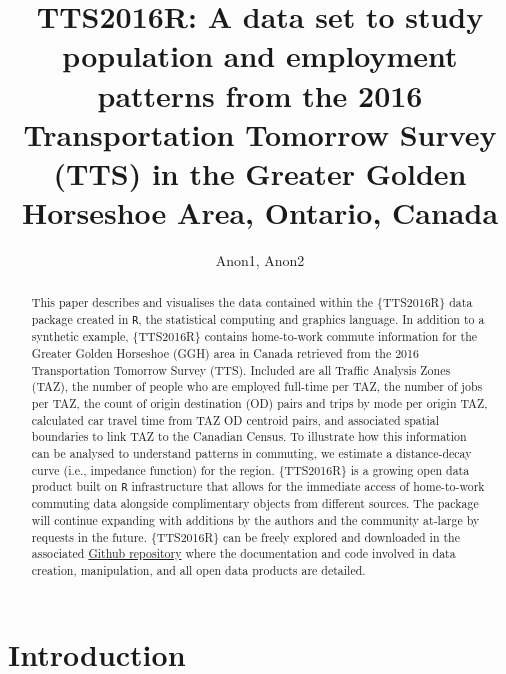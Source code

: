 \documentclass[Royal,times,sageh]{sagej}
\begin{document}

\title{TTS2016R: A data set to study population and employment patterns
from the 2016 Transportation Tomorrow Survey (TTS) in the Greater Golden
Horseshoe Area, Ontario, Canada}

\runninghead{}

\author{Anon1\affilnum{}, Anon2\affilnum{}}

\affiliation{\affilnum{}{}}



\begin{abstract}
This paper describes and visualises the data contained within the
\{TTS2016R\} data package created in \texttt{R}, the statistical
computing and graphics language. In addition to a synthetic example,
\{TTS2016R\} contains home-to-work commute information for the Greater
Golden Horseshoe (GGH) area in Canada retrieved from the 2016
Transportation Tomorrow Survey (TTS). Included are all Traffic Analysis
Zones (TAZ), the number of people who are employed full-time per TAZ,
the number of jobs per TAZ, the count of origin destination (OD) pairs
and trips by mode per origin TAZ, calculated car travel time from TAZ OD
centroid pairs, and associated spatial boundaries to link TAZ to the
Canadian Census. To illustrate how this information can be analysed to
understand patterns in commuting, we estimate a distance-decay curve
(i.e., impedance function) for the region. \{TTS2016R\} is a growing
open data product built on \texttt{R} infrastructure that allows for the
immediate access of home-to-work commuting data alongside complimentary
objects from different sources. The package will continue expanding with
additions by the authors and the community at-large by requests in the
future. \{TTS2016R\} can be freely explored and downloaded in the
associated \href{https://github.com/soukhova/TTS2016R}{Github
repository} where the documentation and code involved in data creation,
manipulation, and all open data products are detailed.
\end{abstract}


\maketitle

\hypertarget{introduction}{%
\section{Introduction}\label{introduction}}
\end{document}
